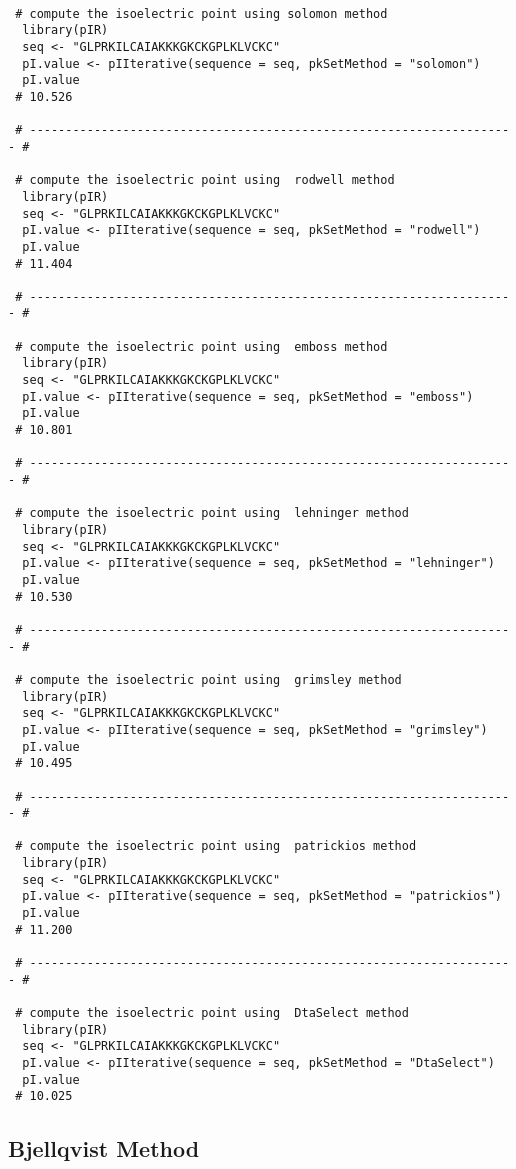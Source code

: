 \documentclass{article}
\begin{document}
\begin{verbatim}

 # compute the isoelectric point using solomon method
  library(pIR)
  seq <- "GLPRKILCAIAKKKGKCKGPLKLVCKC"
  pI.value <- pIIterative(sequence = seq, pkSetMethod = "solomon")
  pI.value
 # 10.526

 # -------------------------------------------------------------------- #

 # compute the isoelectric point using  rodwell method
  library(pIR)
  seq <- "GLPRKILCAIAKKKGKCKGPLKLVCKC"
  pI.value <- pIIterative(sequence = seq, pkSetMethod = "rodwell")
  pI.value
 # 11.404

 # -------------------------------------------------------------------- #

 # compute the isoelectric point using  emboss method
  library(pIR)
  seq <- "GLPRKILCAIAKKKGKCKGPLKLVCKC"
  pI.value <- pIIterative(sequence = seq, pkSetMethod = "emboss")
  pI.value
 # 10.801

 # -------------------------------------------------------------------- #

 # compute the isoelectric point using  lehninger method
  library(pIR)
  seq <- "GLPRKILCAIAKKKGKCKGPLKLVCKC"
  pI.value <- pIIterative(sequence = seq, pkSetMethod = "lehninger")
  pI.value
 # 10.530

 # -------------------------------------------------------------------- #

 # compute the isoelectric point using  grimsley method
  library(pIR)
  seq <- "GLPRKILCAIAKKKGKCKGPLKLVCKC"
  pI.value <- pIIterative(sequence = seq, pkSetMethod = "grimsley")
  pI.value
 # 10.495

 # -------------------------------------------------------------------- #

 # compute the isoelectric point using  patrickios method
  library(pIR)
  seq <- "GLPRKILCAIAKKKGKCKGPLKLVCKC"
  pI.value <- pIIterative(sequence = seq, pkSetMethod = "patrickios")
  pI.value
 # 11.200

 # -------------------------------------------------------------------- #

 # compute the isoelectric point using  DtaSelect method
  library(pIR)
  seq <- "GLPRKILCAIAKKKGKCKGPLKLVCKC"
  pI.value <- pIIterative(sequence = seq, pkSetMethod = "DtaSelect")
  pI.value
 # 10.025

\end{verbatim}

\subsection{Bjellqvist Method}
\end{document}
